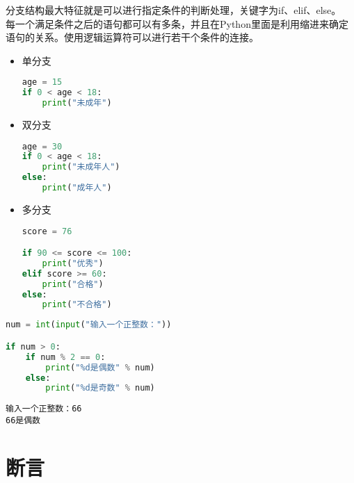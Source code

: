 分支结构最大特征就是可以进行指定条件的判断处理，关键字为if、elif、else。 \\

每一个满足条件之后的语句都可以有多条，并且在Python里面是利用缩进来确定语句的关系。使用逻辑运算符可以进行若干个条件的连接。

\begin{itemize}
    \item 单分支
          \vspace{-0.5cm}
          \begin{lstlisting}[language=Python]
age = 15
if 0 < age < 18:
    print("未成年")
\end{lstlisting}

    \item 双分支
          \vspace{-0.5cm}
          \begin{lstlisting}[language=Python]
age = 30
if 0 < age < 18:
    print("未成年人")
else:
    print("成年人")
\end{lstlisting}

    \item 多分支
          \vspace{-0.5cm}
          \begin{lstlisting}[language=Python]
score = 76

if 90 <= score <= 100:
    print("优秀")
elif score >= 60:
    print("合格")
else:
    print("不合格")
\end{lstlisting}
\end{itemize}


\begin{lstlisting}[language=Python]
num = int(input("输入一个正整数："))

if num > 0:
    if num % 2 == 0:
        print("%d是偶数" % num)
    else:
        print("%d是奇数" % num)
\end{lstlisting}

\begin{tcolorbox}
    \begin{verbatim}
输入一个正整数：66
66是偶数
	\end{verbatim}
\end{tcolorbox}

\newpage

\section{断言}

